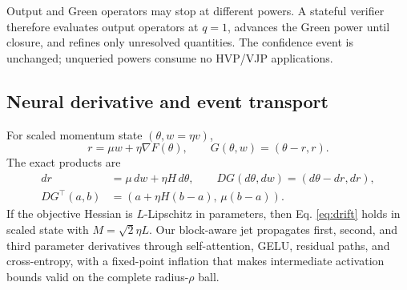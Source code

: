 \documentclass{article}
\begin{document}
Output and Green operators may stop at different powers.  A stateful verifier
therefore evaluates output operators at $q=1$, advances the Green power until
closure, and refines only unresolved quantities.  The confidence event is
unchanged; unqueried powers consume no HVP/VJP applications.

\subsection{Neural derivative and event transport}

For scaled momentum state $(\theta,w=\eta v)$,
\begin{equation}
 r=\mu w+\eta\nabla F(\theta),\qquad
 G(\theta,w)=(\theta-r,r).
 \label{eq:momentum}
\end{equation}
The exact products are
\begin{align}
 dr&=\mu\,dw+\eta H\,d\theta,\qquad
 DG(d\theta,dw)=(d\theta-dr,dr),
 \label{eq:momjvp}\\
 DG^\top(a,b)&=(a+\eta H(b-a),\,\mu(b-a)).
 \label{eq:momvjp}
\end{align}
If the objective Hessian is $L$-Lipschitz in parameters, then Eq.
\eqref{eq:drift} holds in scaled state with $M=\sqrt2\eta L$.  Our block-aware
jet propagates first, second, and third parameter derivatives through
self-attention, GELU, residual paths, and cross-entropy, with a fixed-point
inflation that makes intermediate activation bounds valid on the complete
radius-$\rho$ ball.
\end{document}
